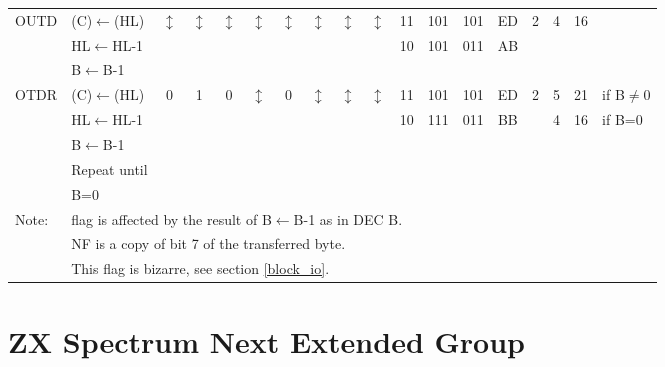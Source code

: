 \documentclass[oneside,a4paper]{book}
\begin{document}
{\begin{tabular}{llcccccccccccccccl}
		OUTD\instrt & 
			(C)$\leftarrow$(HL) & 
			$\updownarrow$\footnotemark[1] & 
				$\updownarrow$\footnotemark[1] & 
				$\updownarrow$\footnotemark[1] & 
				$\updownarrow$\footnotemark[3] & 
				$\updownarrow$\footnotemark[1] & 
				$\updownarrow$\footnotemark[3] & 
				$\updownarrow$\footnotemark[2] & 
				$\updownarrow$\footnotemark[3] & 
			11 & 101 & 101 & 
			ED & 2 & 
			4 & 16 & \\
			& HL$\leftarrow$HL-1 & \multicolumn{8}{c}{} & 10 & 101 & 011 & AB & \\
			& B$\leftarrow$B-1 & \instrb \\

		OTDR\instrt & 
			(C)$\leftarrow$(HL) & 
			0 & 
				1 & 
				0 & 
				$\updownarrow$\footnotemark[3] & 
				0 & 
				$\updownarrow$\footnotemark[3] & 
				$\updownarrow$\footnotemark[2] & 
				$\updownarrow$\footnotemark[5] & 
			11 & 101 & 101 & 
			ED & 2 & 
			5 & 21 & {if B$\not=$0} \\
			& HL$\leftarrow$HL-1 & \multicolumn{8}{c}{} & 10 & 111 & 011 & BB & & 4 & 16 & {if B=0} \\
			& B$\leftarrow$B-1 \\
			& Repeat until \\
			& B=0 & \instrb \\
			
		\hline

		Note:
			& \multicolumn{17}{l}{\parbox{12cm}{\footnotemark[1] flag is affected by the result of B$\leftarrow$B-1 as in DEC B.}}\notet \\

			& \multicolumn{17}{l}{\parbox{12cm}{\footnotemark[2] NF is a copy of bit 7 of the transferred byte.}} \\

			& \multicolumn{17}{l}{\parbox{12cm}{\footnotemark[3] This flag is bizarre, see section \ref{block_io}.}}\noteb \\
			
		\hline

	\end{tabular}
}


\section{ZX Spectrum Next Extended Group}
\end{document}
